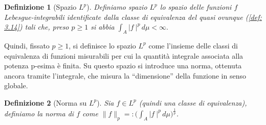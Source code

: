 \documentclass[a4paper,12pt]{report}
\newtheorem{definizione}{Definizione}[chapter]
\newcommand{\lt}{<}
\begin{document}
\begin{definizione}[Spazio $L^p$]\label{def: 3.15}
    Definiamo spazio $L^p$ lo spazio delle funzioni $f$ Lebesgue-integrabili identificate dalla classe di equivalenza del quasi ovunque (\ref{def: 3.14}) tali che, preso $p \geq 1$ si abbia $\displaystyle\int_A|f\ |^p\,d\mu \lt\infty.$
\end{definizione}

Quindi, fissato $p\geq 1$, si definisce lo spazio $L^p$ come l’insieme delle classi di equivalenza di funzioni misurabili per cui la quantità integrale associata alla potenza p-esima è finita. Su questo spazio si introduce una norma, ottenuta ancora tramite l’integrale, che misura la “dimensione” della funzione in senso globale.

\begin{definizione}[Norma su $L^p$]
   Sia $f\in L^p$ (quindi una classe di equivalenza),  definiamo la norma di $f$ come $\|f\|_p=:\bigg(\displaystyle\int_A|f\ |^p\,d\mu\bigg)^\frac{1}{p}$.
\end{definizione}
\end{document}
